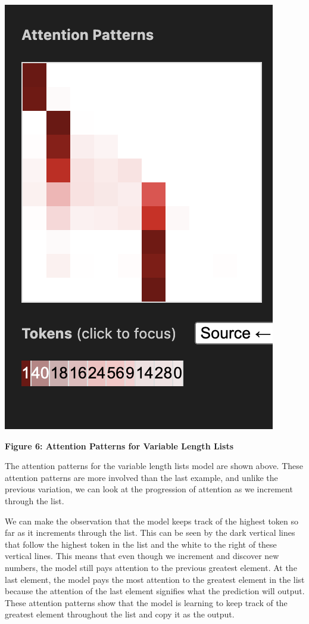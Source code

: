 \documentclass{article}
\begin{document}
\begin{center}
    \includegraphics[scale=0.4]{images/att_variable3.png}

    \textbf{Figure 6: Attention Patterns for Variable Length Lists}
\end{center}

The attention patterns for the variable length lists model are shown above. These attention patterns are more involved than the last example, and unlike the previous variation, we can look at the progression of attention as we increment through the list. 

We can make the observation that the model keeps track of the highest token so far as it increments through the list. This can be seen by the dark vertical lines that follow the highest token in the list and the white to the right of these vertical lines. This means that even though we increment and discover new numbers, the model still pays attention to the previous greatest element. At the last element, the model pays the most attention to the greatest element in the list because the attention of the last element signifies what the prediction will output. These attention patterns show that the model is learning to keep track of the greatest element throughout the list and copy it as the output.
\end{document}
